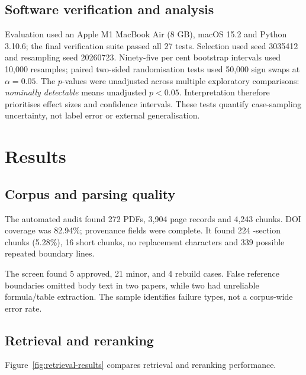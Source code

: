 \documentclass[11pt,a4paper]{article}
\newcommand{\code}[1]{\texttt{\detokenize{#1}}}
\begin{document}
\subsection{Software verification and analysis}
\label{sec:software-verification-and-analysis}

Evaluation used an Apple M1 MacBook Air (8 GB), macOS 15.2 and Python 3.10.6; the final verification suite passed all 27 tests. Selection used seed 3035412 and resampling seed 20260723. Ninety-five per cent bootstrap intervals used 10,000 resamples; paired two-sided randomisation tests used 50,000 sign swaps at \(\alpha=0.05\). The \(p\)-values were unadjusted across multiple exploratory comparisons: \emph{nominally detectable} means unadjusted \(p<0.05\). Interpretation therefore prioritises effect sizes and confidence intervals. These tests quantify case-sampling uncertainty, not label error or external generalisation.

\FloatBarrier
\section{Results}
\label{sec:results}

\subsection{Corpus and parsing quality}
\label{sec:corpus-and-parsing-quality}

The automated audit found 272 PDFs, 3,904 page records and 4,243 chunks. DOI coverage was 82.94\%; provenance fields were complete. It found 224 \code{Unknown}-section chunks (5.28\%), 16 short chunks, no replacement characters and 339 possible repeated boundary lines.

The screen found 5 approved, 21 minor, and 4 rebuild cases. False reference boundaries omitted body text in two papers, while two had unreliable formula/table extraction. The sample identifies failure types, not a corpus-wide error rate.

\subsection{Retrieval and reranking}
\label{sec:retrieval-and-reranking}

Figure~\ref{fig:retrieval-results} compares retrieval and reranking performance.
\end{document}
